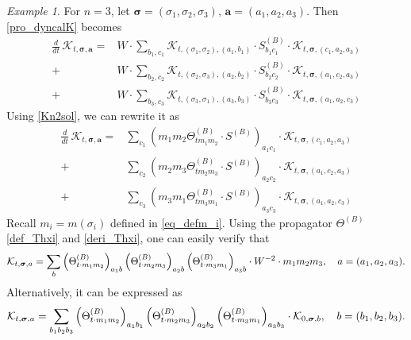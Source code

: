 \documentclass[10pt,reqno]{article}
\theoremstyle{plain} %
\theoremstyle{remark}
\newtheorem{example}[theorem]{Example}
\numberwithin{equation}{section}
\begin{document}
\begin{example}%
For  $n=3$, let 
$\boldsymbol{\sigma}=(\sigma_1, \sigma_2,\sigma_3), \,
\textbf{a}=(a_1, a_2,a_3)$.
Then  \eqref{pro_dyncalK} becomes 
\begin{align}    \frac{d}{dt}\, \mathcal{K}_{t, \boldsymbol{\sigma}, \textbf{a}} = & W \cdot \sum_{b_1, c_1} \mathcal{K}_{t, (\sigma_1,\sigma_2), (a_1, b_1)} \cdot S^{(B)}_{b_1c_1} \cdot \mathcal{K}_{t, \boldsymbol{\sigma}, (c_1, a_2, a_3)}\nonumber \\
    + & W \cdot \sum_{b_2, c_2} \mathcal{K}_{t, (\sigma_2,\sigma_3), (a_2, b_2)} \cdot S^{(B)}_{b_2c_2} \cdot \mathcal{K}_{t, \boldsymbol{\sigma}, (a_1, c_2, a_3)}\nonumber \\
    + & W \cdot \sum_{b_3, c_3} \mathcal{K}_{t, (\sigma_3,\sigma_1), (a_3, b_3)} \cdot S^{(B)}_{b_3c_3} \cdot \mathcal{K}_{t, \boldsymbol{\sigma}, (a_1, a_2, c_3)} \nonumber
\end{align}
Using \eqref{Kn2sol}, we can rewrite it as 
\begin{align} 
    \frac{d}{dt}\, \mathcal{K}_{t, \boldsymbol{\sigma}, \textbf{a}} = &  \sum_{  c_1} \left( m_1m_2\Theta^{(B)}_{tm_1m_2} \cdot S^{(B)}\right)_{a_1c_1} \cdot \mathcal{K}_{t, \boldsymbol{\sigma}, (c_1, a_2, a_3)}\nonumber \\
    + & \sum_{  c_2} \left(m_2m_3 \Theta^{(B)}_{tm_2m_3} \cdot S^{(B)}\right)_{a_2c_2}  \cdot \mathcal{K}_{t, \boldsymbol{\sigma}, (a_1, c_2, a_3)}\nonumber \\
   + & \sum_{  c_3} \left( m_3m_1\Theta^{(B)}_{tm_3m_1} \cdot S^{(B)}\right)_{a_3c_3}  \cdot \mathcal{K}_{t, \boldsymbol{\sigma}, (a_1, a_2, c_3)} \nonumber
\end{align}
Recall 
$
m_i = m  (\sigma_i)
$ defined in \eqref{eq_defm_i}. Using the propagator  $\Theta^{(B)}$  \eqref{def_Thxi} and  \eqref{deri_Thxi}, one can easily verify that 
$$
{\cal K}_{t, \boldsymbol{\sigma}, \textbf{a}} = \sum_b \left(\Theta^{(B)}_{t \cdot m_1 m_2}\right)_{a_1 b} \left(\Theta^{(B)}_{t \cdot m_2 m_3}\right)_{a_2 b} \left(\Theta^{(B)}_{t \cdot m_3 m_1}\right)_{a_3 b} \cdot W^{-2}\cdot m_1 m_2 m_3, \quad  \textbf{a}= (a_1, a_2,a_3).
$$
Alternatively, it can be expressed as
$$
{\cal K}_{t, \boldsymbol{\sigma}, \textbf{a}} = \sum_{b_1 b_2 b_3} \left(\Theta^{(B)}_{t \cdot m_1 m_2}\right)_{a_1 b_1} \left(\Theta^{(B)}_{t \cdot m_2 m_3}\right)_{a_2 b_2} \left(\Theta^{(B)}_{t \cdot m_3 m_1}\right)_{a_3 b_3} \cdot {\cal K}_{0, \boldsymbol{\sigma}, \textbf{b}}, \quad \textbf{b} = (b_1, b_2, b_3).
$$
\end{example}
\end{document}
